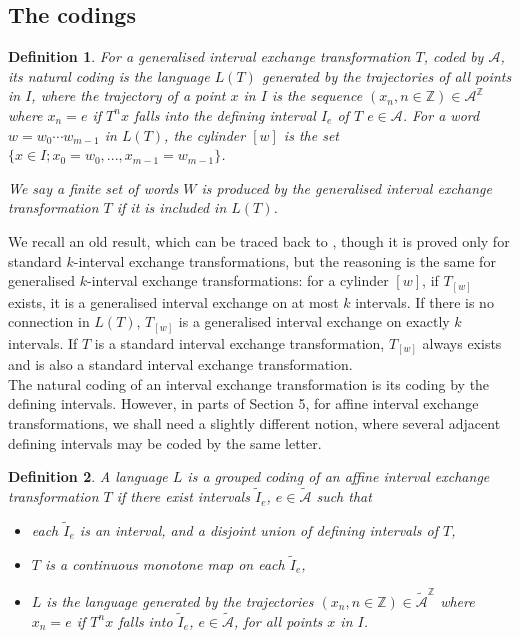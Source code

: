 \documentclass[12pt,a4paper]{amsart}
\newcommand{\GZ}{{\mathbb Z}}
\newtheorem{definition}{Definition}
\begin{document}
\subsection{The codings}
\begin{definition}\label{sy} For a generalised 
interval exchange transformation $T$, coded by $\mathcal A$, its {\em natural coding} is  the  language
 $L(T)$ generated by the {\em trajectories} of all points in $I$,  where the trajectory of a point $x$ in $I$ is the
sequence
$(x_n, n\in\GZ) \in \mathcal A^{\GZ}$ where $x_{n}=e$ if ${T}^nx$ falls into the defining interval 
$I_e$ of $T$ $e\in \mathcal A$. For a word $w=w_0\cdots w_{m-1}$ in $L(T)$, the {\em cylinder} $[w]$ is the  set $\{x\in I; x_0=w_0, ..., x_{m-1}=w_{m-1}\}$.

We say a finite set of words $W$ is {\em produced} by the   generalised 
interval exchange transformation $T$ if it is included in $L(T)$.
\end{definition}

We recall an old result, which can be traced back to \cite{kat}, though it is proved only for standard $k$-interval exchange transformations, but the reasoning is the same for generalised $k$-interval exchange transformations: for a cylinder $[w]$, if  $T_{[w]}$ exists, it is a generalised interval exchange on at most $k$ intervals. If there is no connection in $L(T)$, $T_{[w]}$ is a generalised interval exchange on exactly  $k$ intervals. If $T$  is a standard interval exchange transformation,  $T_{[w]}$ always exists and is also a standard interval exchange transformation.\\

The natural coding of an interval exchange transformation is its coding by the defining intervals. However, in parts of Section 5, for affine interval exchange transformations, we shall need a slightly different notion, where several adjacent defining intervals may be coded by the same letter.



\begin{definition}\label{gc} A language $L$ is a {\em grouped coding} of an affine interval exchange transformation $T$ if there exist intervals $\tilde I_e$, $e\in\tilde{\mathcal A}$ such that
\begin{itemize}
\item each $\tilde I_e$ is an interval, and a disjoint  union of defining intervals of $T$,
\item $T$ is a continuous monotone map on each $\tilde I_e$,
\item $L$ is the language generated by the trajectories $(x_n, n\in \GZ) \in \tilde{\mathcal A}^{\GZ}$ where $x_{n}=e$ if ${T}^nx$ falls into
$\tilde I_e$, $e\in \tilde{\mathcal A}$, for all points $x$ in $I$.
\end{itemize}
\end{definition}
\end{document}
